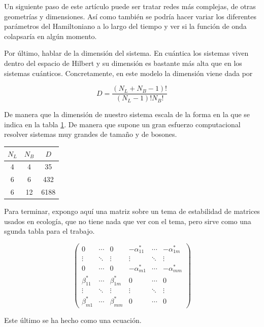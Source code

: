 \documentclass[11pt,a4paper]{article}
\begin{document}
Un siguiente paso de este artículo puede ser tratar redes más complejas, de otras geometrías y dimensiones. Así como también se podría hacer variar los diferentes parámetros del Hamiltoniano a lo largo del tiempo y ver si la función de onda colapsaría en algún momento.

Por último, hablar de la dimensión del sistema. En cuántica los sistemas viven dentro del espacio de Hilbert y su dimensión es bastante más alta que en los sistemas cuánticos. Concretamente, en este modelo la dimensión viene dada por

\begin{equation}
  D=\frac{(N_L+N_B-1)!}{(N_L-1)!N_B!}
\end{equation}

De manera que la dimensión de nuestro sistema escala de la forma en la que se indica en la tabla \ref{t:dimension}. De manera que supone un gran esfuerzo computacional resolver sistemas muy grandes de tamaño y de bosones.


\begin{table}[h]
  \centering
  
  \begin{tabular}{|c||c||c|}
    
    \hline
    $N_L$ & $N_B$ & $D$ \\
    \hline
    4 & 4 & 35 \\
    \hline
    6 & 6 & 432 \\
    \hline
    6 & 12 & 6188 \\
    \hline
  \end{tabular}
  \label{t:dimension}
\end{table}


Para terminar, expongo aquí una matriz sobre un tema de estabilidad de matrices usados en ecología, que no tiene nada que ver con el tema, pero sirve como una sgunda tabla para el trabajo.

\begin{equation}
  \left(
  \begin{array}{cccccc}
    0 & \cdots & 0 & -\alpha_{11}^* & \cdots & -\alpha_{1m}^* \\
    \vdots & \ddots & \vdots & \vdots & \ddots & \vdots \\
    0 & \cdots & 0 & -\alpha_{m1}^* & \cdots & -\alpha_{mm}^* \\
    \beta_{11}^* & \cdots & \beta_{1m}^* & 0 & \cdots & 0 \\
    \vdots & \ddots & \vdots & \vdots & \ddots & \vdots \\
    \beta_{m1}^* & \cdots & \beta_{mm}^* & 0 & \cdots & 0 
  \end{array}
  \right)
\end{equation}

Este último se ha hecho como una ecuación.






\nocite{Smith}
\nocite{Galindo}
\nocite{Sakurai}
\nocite{Laser}
\nocite{Ashcroft}
\nocite{Caos}
\nocite{Yo}
\end{document}
